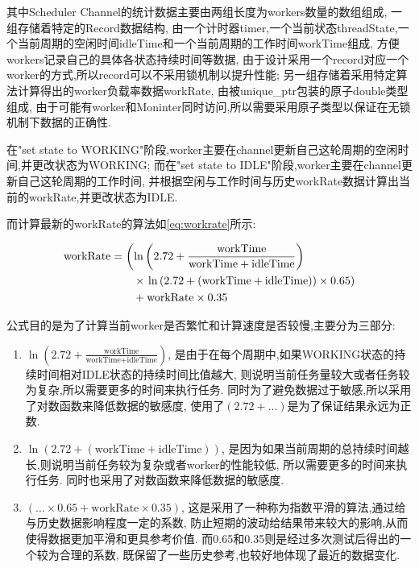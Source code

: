\documentclass{mproj}
\begin{document}
其中Scheduler Channel的统计数据主要由两组长度为workers数量的数组组成,
一组存储着特定的Record数据结构,
由一个计时器timer,一个当前状态threadState,一个当前周期的空闲时间idleTime和一个当前周期的工作时间workTime组成,
方便workers记录自己的具体各状态持续时间等数据,
由于设计采用一个record对应一个worker的方式,所以record可以不采用锁机制以提升性能;
另一组存储着采用特定算法计算得出的worker负载率数据workRate,
由被unique\_ptr包装的原子double类型组成,
由于可能有worker和Moninter同时访问,所以需要采用原子类型以保证在无锁机制下数据的正确性.

在"set state to WORKING"阶段,worker主要在channel更新自己这轮周期的空闲时间,并更改状态为WORKING;
而在"set state to IDLE"阶段,worker主要在channel更新自己这轮周期的工作时间,
并根据空闲与工作时间与历史workRate数据计算出当前的workRate,并更改状态为IDLE.

而计算最新的workRate的算法如\cref{eq:workrate}所示:

\begin{align}
    \text{workRate} & = \left( \ln\left( 2.72 + \frac{\text{workTime}}{\text{workTime} + \text{idleTime}} \right) \right. \notag   \\
                    & \qquad \times \left. \ln\left( 2.72 + (\text{workTime} + \text{idleTime}) \right) \times 0.65 \right) \notag \\
                    & \qquad + \text{workRate} \times 0.35 \label{eq:workrate}
\end{align}

公式目的是为了计算当前worker是否繁忙和计算速度是否较慢,主要分为三部分:
\begin{enumerate}
    \item $\ln\left( 2.72 + \frac{\text{workTime}}{\text{workTime} + \text{idleTime}} \right)$,
          是由于在每个周期中,如果WORKING状态的持续时间相对IDLE状态的持续时间比值越大,
          则说明当前任务量较大或者任务较为复杂,所以需要更多的时间来执行任务.
          同时为了避免数据过于敏感,所以采用了对数函数来降低数据的敏感度,
          使用了$(2.72+...)$是为了保证结果永远为正数.

    \item $\ln\left( 2.72 + (\text{workTime} + \text{idleTime}) \right)$,
          是因为如果当前周期的总持续时间越长,则说明当前任务较为复杂或者worker的性能较低,
          所以需要更多的时间来执行任务.
          同时也采用了对数函数来降低数据的敏感度.

    \item $(... \times 0.65 +\text{workRate} \times 0.35)$,
          这是采用了一种称为指数平滑\cite{GARDNER2006637}的算法,通过给与历史数据影响程度一定的系数,
          防止短期的波动给结果带来较大的影响,从而使得数据更加平滑和更具参考价值.
          而0.65和0.35则是经过多次测试后得出的一个较为合理的系数,
          既保留了一些历史参考,也较好地体现了最近的数据变化.
\end{enumerate}
\end{document}
